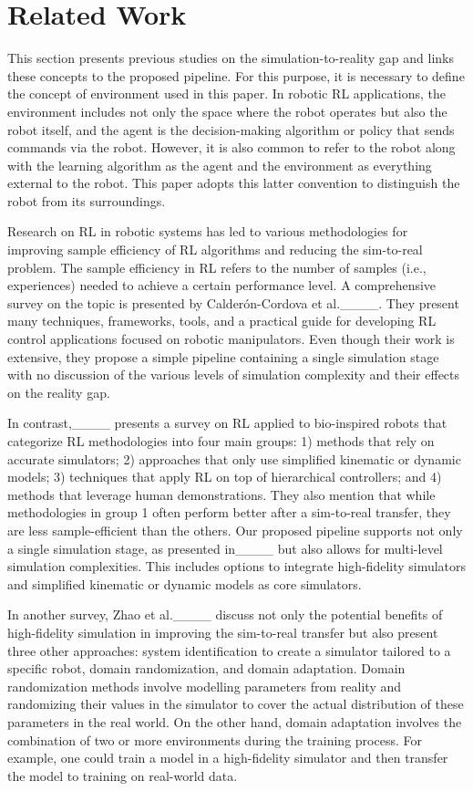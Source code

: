 \section{Related Work}
\label{sec:related}

This section presents previous studies on the simulation-to-reality gap and links these concepts to the proposed pipeline. For this purpose, it is necessary to define the concept of environment used in this paper. In robotic RL applications, the environment includes not only the space where the robot operates but also the robot itself, and the agent is the decision-making algorithm or policy that sends commands via the robot.  However, it is also common to refer to the robot along with the learning algorithm as the agent and the environment as everything external to the robot. This paper adopts this latter convention to distinguish the robot from its surroundings.

Research on RL in robotic systems has led to various methodologies for improving sample efficiency of RL algorithms and reducing the sim-to-real problem. The sample efficiency in RL refers to the number of samples (i.e., experiences) needed to achieve a certain performance level. A comprehensive survey on the topic is presented by Calderón-Cordova et al.____. They present many techniques, frameworks, tools, and a practical guide for developing RL control applications focused on robotic manipulators. Even though their work is extensive, they propose a simple pipeline containing a single simulation stage with no discussion of the various levels of simulation complexity and their effects on the reality gap. 

In contrast,____ presents a survey on RL applied to bio-inspired robots that categorize RL methodologies into four main groups: 1) methods that rely on accurate simulators; 2) approaches that only use simplified kinematic or dynamic models; 3) techniques that apply RL on top of hierarchical controllers; and 4) methods that leverage human demonstrations. They also mention that while methodologies in group 1 often perform better after a sim-to-real transfer, they are less sample-efficient than the others. Our proposed pipeline supports not only a single simulation stage, as presented in____ but also allows for multi-level simulation complexities. This includes options to integrate high-fidelity simulators and simplified kinematic or dynamic models as core simulators.

In another survey, Zhao et al.____ discuss not only the potential benefits of high-fidelity simulation in improving the sim-to-real transfer but also present three other approaches: system identification to create a simulator tailored to a specific robot, domain randomization, and domain adaptation. Domain randomization methods involve modelling parameters from reality and randomizing their values in the simulator to cover the actual distribution of these parameters in the real world. On the other hand, domain adaptation involves the combination of two or more environments during the training process. For example, one could train a model in a high-fidelity simulator and then transfer the model to training on real-world data.

